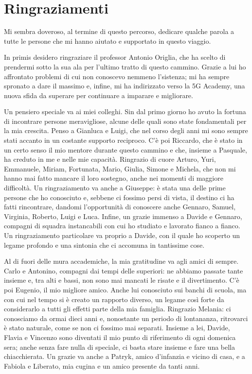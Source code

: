 \newpage\pagestyle{plain}

\chapter*{Ringraziamenti}

Mi sembra doveroso, al termine di questo percorso, dedicare qualche parola a tutte le persone che mi hanno aiutato e supportato in questo viaggio.

In primis desidero ringraziare il professor Antonio Origlia, che ha scelto di prendermi sotto la sua ala per l'ultimo tratto di questo cammino. Grazie a lui ho affrontato problemi di cui non conoscevo nemmeno l'sistenza; mi ha sempre spronato a dare il massimo e, infine, mi ha indirizzato verso la 5G Academy, una nuova sfida da superare per continuare a imparare e migliorare.

Un pensiero speciale va ai miei colleghi. Sin dal primo giorno ho avuto la fortuna di incontrare persone meravigliose, alcune delle quali sono state fondamentali per la mia crescita. Penso a Gianluca e Luigi, che nel corso degli anni mi sono sempre stati accanto in un costante supporto reciproco. C'è poi Riccardo, che è stato in un certo senso il mio mentore durante questo cammino e che, insieme a Pasquale, ha creduto in me e nelle mie capacità. Ringrazio di cuore Arturo, Yuri, Emmanuele, Miriam, Fortunata, Mario, Giulia, Simone e Michela, che non mi hanno mai fatto mancare il loro sostegno, anche nei momenti di maggiore difficoltà. Un ringraziamento va anche a Giuseppe: è stata una delle prime persone che ho conosciuto e, sebbene ci fossimo persi di vista, il destino ci ha fatti rincontrare, dandomi l'opportunità di conoscere anche Gennaro, Samuel, Virginia, Roberto, Luigi e Luca. Infine, un grazie immenso a Davide e Gennaro, compagni di squadra instancabili con cui ho studiato e lavorato fianco a fianco. Un ringraziamento particolare va proprio a Davide, con il quale ho scoperto un legame profondo e una sintonia che ci accomuna in tantissime cose.

Al di fuori delle mura accademiche, la mia gratitudine va agli amici di sempre. Carlo e Antonino, compagni dai tempi delle superiori: ne abbiamo passate tante insieme e, tra alti e bassi, non sono mai mancati le risate e il divertimento. C'è poi Eugenio, il mio migliore amico. Anche lui conosciuto sui banchi di scuola, ma con cui nel tempo si è creato un rapporto diverso, un legame così forte da considerarlo a tutti gli effetti parte della mia famiglia. Ringrazio Melania: ci conosciamo da ormai dieci anni e, nonostante un periodo di lontananza, ritrovarci è stato naturale, come se non ci fossimo mai separati. Insieme a lei, Davide, Flavia e Vincenzo sono diventati il mio punto di riferimento di ogni domenica sera; anche senza fare nulla di speciale, ci basta stare insieme e fare una bella chiacchierata. Un grazie va anche a Patryk, amico d'infanzia e vicino di casa, e a Fabiola e Liberato, mia cugina e un amico presente da tanti anni.

